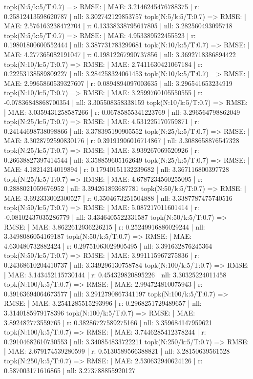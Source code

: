 topk(N:5/k:5/T:0.7) => RMSE: | MAE: 3.2146245476788375 | r: 0.25812413598620787 | nll: 3.302742129853757
topk(N:5/k:5/T:0.7) => RMSE: | MAE: 2.576163238472704 | r: 0.13338338795617805 | nll: 3.282560493095718
topk(N:5/k:5/T:0.7) => RMSE: | MAE: 4.953389522455523 | r: 0.19801800600552444 | nll: 3.387731783299681
topk(N:10/k:5/T:0.7) => RMSE: | MAE: 4.277365082191047 | r: 0.19812267990737856 | nll: 3.3692718386894422
topk(N:10/k:5/T:0.7) => RMSE: | MAE: 2.7411630421067184 | r: 0.22253138589809227 | nll: 3.284258324061453
topk(N:10/k:5/T:0.7) => RMSE: | MAE: 2.9965860539327607 | r: 0.0894894097003635 | nll: 3.296541653234919
topk(N:10/k:5/T:0.7) => RMSE: | MAE: 3.2599760105550555 | r: -0.07836848868700354 | nll: 3.305508358338159
topk(N:10/k:5/T:0.7) => RMSE: | MAE: 3.0359431258587266 | r: 0.06785855341223769 | nll: 3.296564798862049
topk(N:25/k:5/T:0.7) => RMSE: | MAE: 4.531225170759871 | r: 0.24144698738098866 | nll: 3.378395190905552
topk(N:25/k:5/T:0.7) => RMSE: | MAE: 3.3028792590830176 | r: 0.39191906016714867 | nll: 3.3088658876547328
topk(N:25/k:5/T:0.7) => RMSE: | MAE: 3.939267069520926 | r: 0.26638827397414544 | nll: 3.358859605162649
topk(N:25/k:5/T:0.7) => RMSE: | MAE: 4.18214214019894 | r: 0.17940151132239682 | nll: 3.367116800397728
topk(N:25/k:5/T:0.7) => RMSE: | MAE: 4.6787234560255095 | r: 0.2888021059676952 | nll: 3.394261893687781
topk(N:50/k:5/T:0.7) => RMSE: | MAE: 3.692333002300527 | r: 0.3504673251504888 | nll: 3.3387787475740516
topk(N:50/k:5/T:0.7) => RMSE: | MAE: 5.087217011601414 | r: -0.08102437035286779 | nll: 3.4346405522331587
topk(N:50/k:5/T:0.7) => RMSE: | MAE: 3.8622612936226215 | r: 0.25249916886029244 | nll: 3.3498086054169187
topk(N:50/k:5/T:0.7) => RMSE: | MAE: 4.630480732882424 | r: 0.29751063029905495 | nll: 3.391632876245364
topk(N:50/k:5/T:0.7) => RMSE: | MAE: 3.991115967275836 | r: 0.24368610204410737 | nll: 3.349296130758784
topk(N:100/k:5/T:0.7) => RMSE: | MAE: 3.143452115730144 | r: 0.454329820895226 | nll: 3.30325224011458
topk(N:100/k:5/T:0.7) => RMSE: | MAE: 2.994724810075943 | r: 0.39163694064673577 | nll: 3.2912790867341197
topk(N:100/k:5/T:0.7) => RMSE: | MAE: 3.2541285515293996 | r: 0.2968251729489657 | nll: 3.3140185979178396
topk(N:100/k:5/T:0.7) => RMSE: | MAE: 3.892482773559765 | r: 0.38286727589275166 | nll: 3.359684147959621
topk(N:100/k:5/T:0.7) => RMSE: | MAE: 3.7446285412378244 | r: 0.29104682610730553 | nll: 3.340854833722211
topk(N:250/k:5/T:0.7) => RMSE: | MAE: 2.679174539280599 | r: 0.5130589566388821 | nll: 3.28150639561528
topk(N:250/k:5/T:0.7) => RMSE: | MAE: 2.530632940624126 | r: 0.587003171616865 | nll: 3.273788855920127
